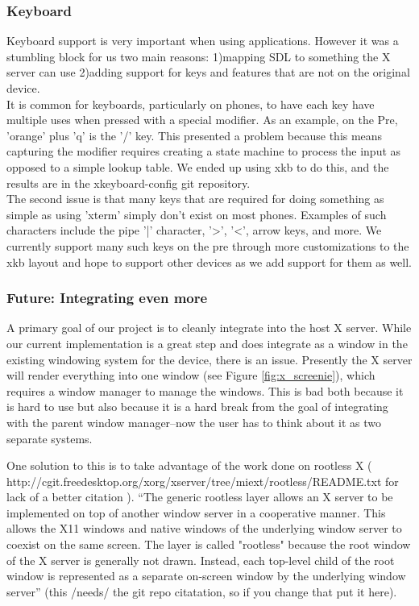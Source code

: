 \subsubsection{Keyboard}
Keyboard support is very important when using applications.  However it was a stumbling block for us two main reasons: 1)mapping SDL to something the X server can use 2)adding support for keys and features that are not on the original device.\\
It is common for keyboards, particularly on phones, to have each key have multiple uses when pressed with a special modifier.  As an example, on the Pre, 'orange' plus 'q' is the '/' key.  This presented a problem because this means capturing the modifier requires creating a state machine to process the input as opposed to a simple lookup table.  We ended up using xkb to do this, and the results are in the xkeyboard-config git repository. \\
The second issue is that many keys that are required for doing something as simple as using 'xterm' simply don't exist on most phones.  Examples of such characters include the pipe '|' character, '>', '<', arrow keys, and more.  We currently support many such keys on the pre through more customizations to the xkb layout and hope to support other devices as we add support for them as well.
\subsubsection{Future: Integrating even more}
A primary goal of our project is to cleanly integrate into the host X server.  While our current implementation is a great step and does integrate as a window in the existing windowing system for the device, there is an issue.  Presently the X server will render everything into one window (see Figure \ref{fig:x_screenie}), which requires a window manager to manage the windows.  This is bad both because it is hard to use but also because it is a hard break from the goal of integrating with the parent window manager--now the user has to think about it as two separate systems.

One solution to this is to take advantage of the work done on rootless X ( http://cgit.freedesktop.org/xorg/xserver/tree/miext/rootless/README.txt for lack of a better citation ).  ``The generic rootless layer allows an X server to be implemented on top of another window server in a cooperative manner. This allows the X11 windows and native windows of the underlying window server to coexist on the same screen. The layer is called "rootless" because the root window of the X server is generally not drawn. Instead, each top-level child of the root window is represented as a separate on-screen window by the underlying window server'' (this /needs/ the git repo citatation, so if you change that put it here).


